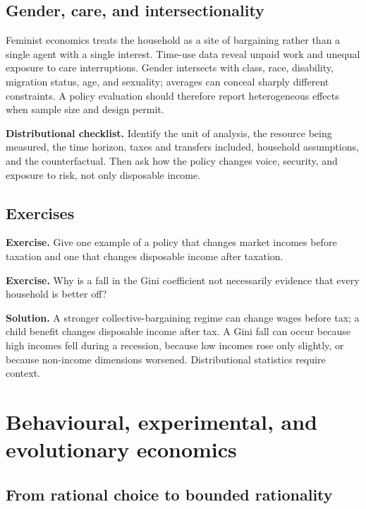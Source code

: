 \documentclass[11pt,oneside,openany]{book}
\newcommand{\exercise}[1]{\textbf{Exercise.} #1}
\newcommand{\solution}[1]{\textbf{Solution.} #1}
\begin{document}
\section{Gender, care, and intersectionality}

Feminist economics treats the household as a site of bargaining rather than a single agent with a single interest. Time-use data reveal unpaid work and unequal exposure to care interruptions. Gender intersects with class, race, disability, migration status, age, and sexuality; averages can conceal sharply different constraints. A policy evaluation should therefore report heterogeneous effects when sample size and design permit.

\begin{keybox}
\textbf{Distributional checklist.} Identify the unit of analysis, the resource being measured, the time horizon, taxes and transfers included, household assumptions, and the counterfactual. Then ask how the policy changes voice, security, and exposure to risk, not only disposable income.
\end{keybox}

\section{Exercises}

\exercise{Give one example of a policy that changes market incomes before taxation and one that changes disposable income after taxation.}

\exercise{Why is a fall in the Gini coefficient not necessarily evidence that every household is better off?}

\solution{A stronger collective-bargaining regime can change wages before tax; a child benefit changes disposable income after tax. A Gini fall can occur because high incomes fell during a recession, because low incomes rose only slightly, or because non-income dimensions worsened. Distributional statistics require context.}

\chapter{Behavioural, experimental, and evolutionary economics}
\label{ch:behaviour}

\section{From rational choice to bounded rationality}
\end{document}
